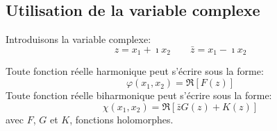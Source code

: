 \subsection{Utilisation de la variable complexe} \label{ssec:Ch08-1.3}
Introduisons la variable complexe: 
\begin{equation}
  z=x_1+\imath x_2 \qquad \bar{z}=x_1-\imath x_2
\label{eq:Ch08-027}
\end{equation}
\begin{thmn}
Toute fonction réelle harmonique peut s'écrire sous la forme: 
\begin{equation}
    \varphi(x_1,x_2)=\Re \left[ F(z) \right]
    \label{eq:Ch08-028}
\end{equation}
Toute fonction réelle biharmonique peut s'écrire sous la forme: 
\begin{equation}
    \chi(x_1,x_2)=\Re \left[ \bar{z}G(z)+K(z) \right]
    \label{eq:Ch08-029}
\end{equation}
avec $F$, $G$ et $K$, fonctions holomorphes. 
\end{thmn}
